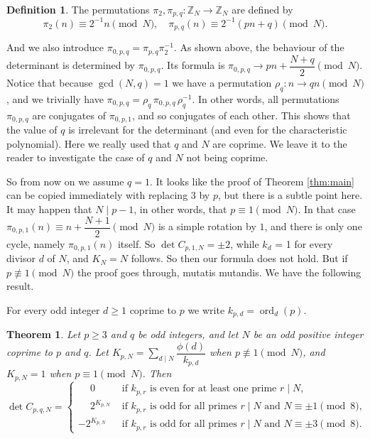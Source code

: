 \documentclass[10pt]{article}
\newtheorem{theorem}{Theorem}
\theoremstyle{definition}
\newtheorem{definition}{Definition}
\newcommand{\Z}{\mathbb{Z}}
\newcommand{\dsum}{\displaystyle\sum}
\DeclareMathOperator{\ord}{ord}
\begin{document}
\begin{definition} \label{def:permpq}
    The permutations $ \pi_2, \pi_{p,q} : \Z_N \to \Z_N $ are defined by
    \[ \pi_2(n) \equiv 2^{-1} n \pmod{N} , \quad \pi_{p,q}(n) \equiv 2^{-1} (p n + q) \pmod{N} . \]
\end{definition}

And we also introduce $ \pi_{0,p,q} = \pi_{p,q} \pi_2^{-1} $. As shown above, the behaviour of the
determinant is determined by $ \pi_{0,p,q} $. Its formula is
$ \pi_{0,p,q} \to p n + \dfrac{N+q}{2} \pmod{N} $. Notice that because $ \gcd(N,q) = 1 $ we have a
permutation $ \rho_q : n \to q n \pmod{N} $, and we trivially have
$ \pi_{0,p,q} = \rho_q \, \pi_{0,p,q} \, \rho_q^{-1} $. In other words, all permutations
$ \pi_{0,p,q} $ are conjugates of $ \pi_{0,p,1} $, and so conjugates of each other. This shows that the
value of $ q $ is irrelevant for the determinant (and even for the characteristic polynomial). Here we
really used that $ q $ and $ N $ are coprime. We leave it to the reader to investigate the case of $ q $
and $ N $ not being coprime.

So from now on we assume $ q = 1 $. It looks like the proof of Theorem \ref{thm:main} can be copied
immediately with replacing $ 3 $ by $ p $, but there is a subtle point here. It may happen that
$ N \mid p - 1 $, in other words, that $ p \equiv 1 \pmod{N} $. In that case
$ \pi_{0,p,1}(n) \equiv n + \dfrac{N+1}{2} \pmod{N} $ is a simple rotation by $ 1 $, and there is only
one cycle, namely $ \pi_{0,p,1}(n) $ itself. So $ \det C_{p,1,N} = \pm 2 $, while $ k_d $ = 1 for every
divisor $ d $ of $ N $, and $ K_N = N $ follows. So then our formula does not hold. But if
$ p \not\equiv 1 \pmod{N} $ the proof goes through, mutatis mutandis. We have the following result.

For every odd integer $ d \geq 1 $ coprime to $ p $ we write $ k_{p,d} = \ord_d(p) $.

\begin{theorem} \label{thm:mainpn+q}
    Let $ p \geq 3 $ and $ q $ be odd integers, and let $ N $ be an odd positive integer coprime to $ p $ and
    $ q $. Let $ K_{p,N} = \dsum_{d \mid N} \dfrac{\phi(d)}{k_{p,d}} $ when $ p \not\equiv 1 \pmod{N} $, and
    $ K_{p,N} = 1 $ when $ p \equiv 1 \pmod{N} $. Then
    \begin{equation}
        \det C_{p,q,N} = \begin{cases}
            \phantom{-}0       & \text{ if } k_{p,r} \text{ is even for at least one prime } r \mid N, \\
            \phantom{-}2^{K_{p,N}} & \text{ if } k_{p,r} \text{ is odd for all primes } r \mid N
            \text{ and } N \equiv \pm 1 \pmod{8}, \\
            -2^{K_{p,N}} & \text{ if } k_{p,r} \text{ is odd for all primes } r \mid N
            \text{ and } N \equiv \pm 3 \pmod{8}.
        \end{cases}
    \end{equation}
\end{theorem}
\end{document}
